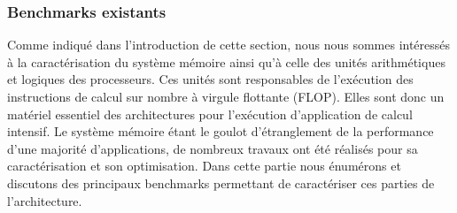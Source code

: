      
    \subsubsection{Benchmarks existants}

        Comme indiqué dans l'introduction de cette section, nous nous sommes intéressés à la caractérisation du système mémoire ainsi qu'à celle des unités arithmétiques et logiques des processeurs. Ces unités sont responsables de l'exécution des instructions de calcul sur nombre à virgule flottante (FLOP). Elles sont donc un matériel essentiel des architectures pour l'exécution d'application de calcul intensif. Le système mémoire étant le goulot d'étranglement de la performance d'une majorité d'applications, de nombreux travaux ont été réalisés pour sa caractérisation et son optimisation. Dans cette partie nous énumérons et discutons des principaux benchmarks permettant de caractériser ces parties de l'architecture.


 
        

